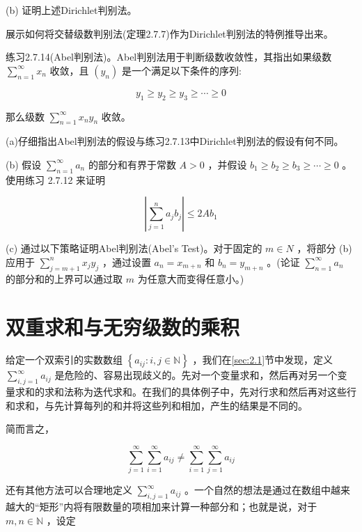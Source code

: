 (b) 证明上述Dirichlet判别法。

展示如何将交替级数判别法(定理2.7.7)作为Dirichlet判别法的特例推导出来。

练习2.7.14(Abel判别法)。Abel判别法用于判断级数收敛性，其指出如果级数 \(\mathop{\sum }\limits_{{n = 1}}^{\infty }{x}_{n}\) 收敛，且 \(\left( {y}_{n}\right)\) 是一个满足以下条件的序列:

\[
{y}_{1} \geq  {y}_{2} \geq  {y}_{3} \geq  \cdots  \geq  0
\]

那么级数 \(\mathop{\sum }\limits_{{n = 1}}^{\infty }{x}_{n}{y}_{n}\) 收敛。

(a)仔细指出Abel判别法的假设与练习2.7.13中Dirichlet判别法的假设有何不同。

(b) 假设 \(\mathop{\sum }\limits_{{n = 1}}^{\infty }{a}_{n}\) 的部分和有界于常数 \(A > 0\) ，并假设 \({b}_{1} \geq  {b}_{2} \geq  {b}_{3} \geq  \cdots  \geq  0\) 。使用练习 2.7.12 来证明

\[
\left| {\mathop{\sum }\limits_{{j = 1}}^{n}{a}_{j}{b}_{j}}\right|  \leq  {2A}{b}_{1}
\]

(c) 通过以下策略证明Abel判别法(Abel’s Test)。对于固定的 \(m \in  N\) ，将部分 (b) 应用于 \(\mathop{\sum }\limits_{{j = m + 1}}^{n}{x}_{j}{y}_{j}\) ，通过设置 \({a}_{n} = {x}_{m + n}\) 和 \({b}_{n} = {y}_{m + n}\) 。(论证 \(\mathop{\sum }\limits_{{n = 1}}^{\infty }{a}_{n}\) 的部分和的上界可以通过取 \(m\) 为任意大而变得任意小。)

\section{双重求和与无穷级数的乘积}
\label{sec:2.8}
给定一个双索引的实数数组 \(\left\{  {{a}_{ij} : i,j \in  \mathbb{N}}\right\}\) ，我们在\ref{sec:2.1}节中发现，定义 \(\mathop{\sum }\limits_{{i,j = 1}}^{\infty }{a}_{ij}\) 是危险的、容易出现歧义的。先对一个变量求和，然后再对另一个变量求和的求和法称为迭代求和。在我们的具体例子中，先对行求和然后再对这些行和求和，与先计算每列的和并将这些列和相加，产生的结果是不同的。

简而言之，

\[
\mathop{\sum }\limits_{{j = 1}}^{\infty }\mathop{\sum }\limits_{{i = 1}}^{\infty }{a}_{ij} \neq  \mathop{\sum }\limits_{{i = 1}}^{\infty }\mathop{\sum }\limits_{{j = 1}}^{\infty }{a}_{ij}
\]

还有其他方法可以合理地定义 \(\mathop{\sum }\limits_{{i,j = 1}}^{\infty }{a}_{ij}\) 。一个自然的想法是通过在数组中越来越大的“矩形”内将有限数量的项相加来计算一种部分和；也就是说，对于 \(m,n \in  \mathbb{N}\) ，设定



